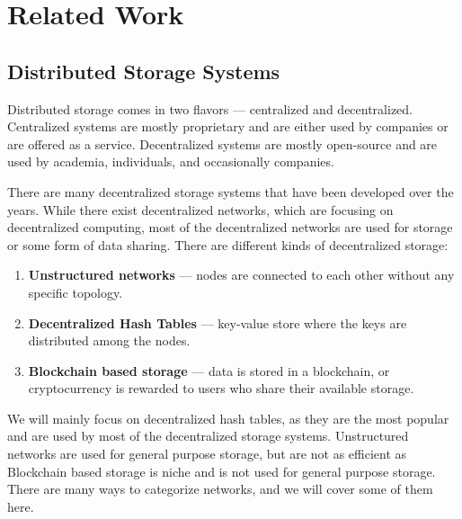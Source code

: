 \label{chapter:related-work}
\chapter{Related Work}

\section{Distributed Storage Systems}

Distributed storage comes in two flavors --- centralized and decentralized.
Centralized systems are mostly proprietary and are either used by companies or are offered as a service.
Decentralized systems are mostly open-source and are used by academia, individuals, and occasionally companies.

There are many decentralized storage systems that have been developed over the years.
While there exist decentralized networks, which are focusing on decentralized computing,
most of the decentralized networks are used for storage or some form of data sharing.
There are different kinds of decentralized storage:
\begin{enumerate}
    \item \textbf{Unstructured networks} --- nodes are connected to each other without any specific topology.
    \item \textbf{Decentralized Hash Tables} --- key-value store where the keys are distributed among the nodes.
    \item \textbf{Blockchain based storage} --- data is stored in a blockchain, or cryptocurrency
        is rewarded to users who share their available storage.
\end{enumerate}

We will mainly focus on decentralized hash tables, as they are the most popular and are used by
most of the decentralized storage systems.
Unstructured networks are used for general purpose storage, but are not as efficient as 
Blockchain based storage is niche and is not used for general purpose storage.
There are many ways to categorize networks, and we will cover some of them here.

